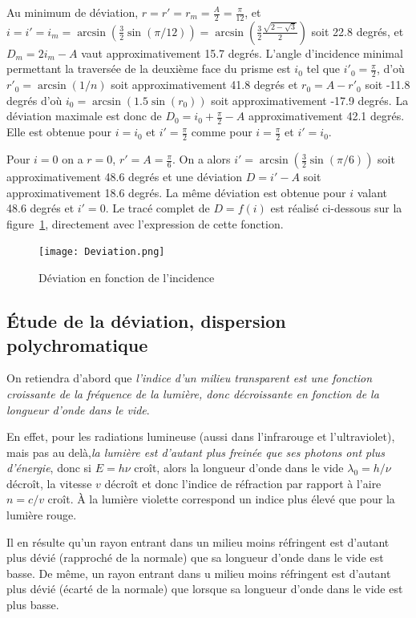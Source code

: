 Au minimum de déviation, \(r=r'=r_m=\frac{A}{2}=\frac{\pi}{12}\), et 
\(i=i'=i_m=\arcsin\left(\frac{3}{2}\sin(\pi/12)\right) = 
\arcsin\left(\frac{3}{2} \frac{\sqrt{2-\sqrt{3}}}{2}\right)\) soit 22.8 degrés, 
et \(D_m=2i_m-A\) vaut approximativement 15.7 degrés.
L'angle d'incidence minimal permettant la traversée de la deuxième face du 
prisme est \(i_0\) tel que \(i'_0=\frac{\pi}{2}\), d'où \(r'_0 = \arcsin(1/n)\) 
soit approximativement 41.8 degrés et \(r_0=A-r'_0\) soit -11.8 degrés d'où 
\(i_0=\arcsin(1.5 \sin(r_0))\) soit approximativement -17.9 degrés. La 
déviation maximale est donc de \(D_0 = i_0 + \frac{\pi}{2}-A\) 
approximativement 42.1 degrés. Elle est obtenue pour \(i=i_0\) et 
\(i'=\frac{\pi}{2}\) comme pour \(i=\frac{\pi}{2}\) et \(i'=i_0\).

Pour \(i=0\) on a \(r=0\), \(r'=A=\frac{\pi}{6}\). On a alors 
\(i'=\arcsin(\frac{3}{2}\sin(\pi/6))\) soit approximativement 48.6 degrés et 
une déviation \(D=i'-A\) soit approximativement 18.6 degrés. La même déviation 
est obtenue pour \(i\) valant 48.6 degrés et \(i'=0\).
Le tracé complet de \(D=f(i)\) est réalisé ci-dessous sur la 
figure~\ref{fig:chap6-deviation}, directement avec l'expression de cette 
fonction.
\begin{figure}%
    \centering
    \texttt{[image: Deviation.png]}
    \caption{Déviation en fonction de l'incidence}
    \label{fig:chap6-deviation}
\end{figure}%
\subsection{Étude de la déviation, dispersion polychromatique}%

On retiendra d'abord que \emph{l'indice d'un milieu transparent est une 
fonction croissante de la fréquence de la lumière, donc décroissante en 
fonction de la longueur d'onde dans le vide}.

En effet, pour les radiations lumineuse (aussi dans l'infrarouge et 
l'ultraviolet), mais pas au delà,\emph{la lumière est d'autant plus freinée que 
ses photons ont plus d'énergie}, donc si \(E=h \nu\) croît, alors la longueur 
d'onde dans le vide \(\lambda_0 = h/\nu\) décroît, la vitesse \(v\) décroît et 
donc l'indice de réfraction par rapport à l'aire \(n=c/v\) croît. À la lumière 
violette correspond un indice plus élevé que pour la lumière rouge.

Il en résulte qu'un rayon entrant dans un milieu moins réfringent est d'autant 
plus dévié (rapproché de la normale) que sa longueur d'onde dans le vide est 
basse. De même, un rayon entrant dans u milieu moins réfringent est d'autant 
plus dévié (écarté de la normale) que lorsque sa longueur d'onde dans le vide 
est plus basse.


